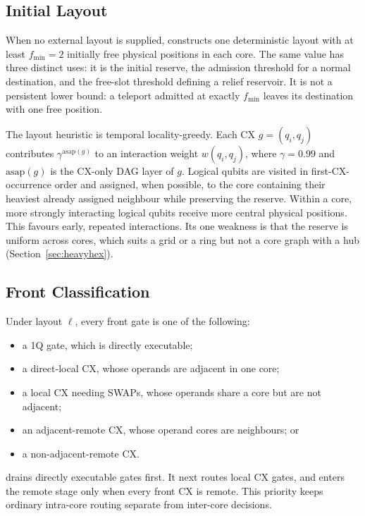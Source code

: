 \subsection{Initial Layout}
\label{sec:sfc-layout}

When no external layout is supplied, \PORTER{} constructs one deterministic
layout with at least $f_\mathrm{min}=2$ initially free physical positions in
each core.  The same value has three distinct uses: it is the initial reserve,
the admission threshold for a normal \TeleData{} destination, and the free-slot
threshold defining a relief reservoir.  It is not a persistent lower bound:
a teleport admitted at exactly $f_\mathrm{min}$ leaves its destination with
one free position.

The layout heuristic is temporal locality-greedy.  Each CX
$g=(q_i,q_j)$ contributes $\gamma^{\mathrm{asap}(g)}$ to an interaction
weight $w(q_i,q_j)$, where $\gamma=0.99$ and $\mathrm{asap}(g)$ is the
CX-only DAG layer of $g$.  Logical qubits are visited in first-CX-occurrence
order and assigned, when possible, to the core containing their heaviest
already assigned neighbour while preserving the reserve.  Within a core,
more strongly interacting logical qubits receive more central physical
positions.  This favours early, repeated interactions. Its one weakness is that the reserve is uniform across
cores, which suits a grid or a ring but not a core graph with a hub
(Section~\ref{sec:heavyhex}).

\subsection{Front Classification}
\label{sec:sfc-classify}

Under layout $\ell$, every front gate is one of the following:
\begin{itemize}[leftmargin=1.2em,itemsep=1pt,topsep=2pt]
\item a 1Q gate, which is directly executable;
\item a direct-local CX, whose operands are adjacent in one core;
\item a local CX needing SWAPs, whose operands share a core but are not adjacent;
\item an adjacent-remote CX, whose operand cores are neighbours; or
\item a non-adjacent-remote CX.
\end{itemize}
\PORTER{} drains directly executable gates first.  It next routes local CX
gates, and enters the remote stage only when every front CX is remote.  This
priority keeps ordinary intra-core routing separate from inter-core decisions.

